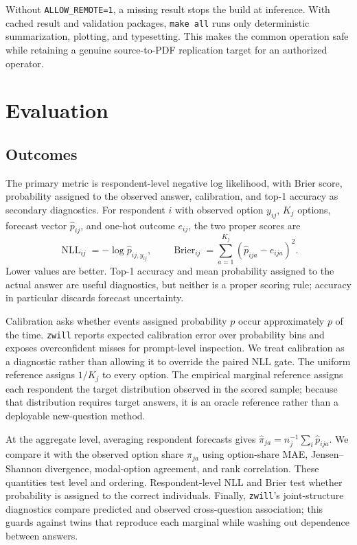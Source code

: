 \documentclass[11pt]{article}
\newcommand{\zwill}{\texttt{zwill}}
\begin{document}
Without \texttt{ALLOW\_REMOTE=1}, a missing result stops the build at
inference. With cached result and validation packages, \texttt{make all} runs
only deterministic summarization, plotting, and typesetting. This makes the
common operation safe while retaining a genuine source-to-PDF replication
target for an authorized operator.

\section{Evaluation}
\subsection{Outcomes}
The primary metric is respondent-level negative log likelihood, with Brier
score, probability assigned to the observed answer, calibration, and top-1
accuracy as secondary diagnostics. For respondent $i$ with observed option
$y_{ij}$, $K_j$ options, forecast vector $\widehat p_{ij}$, and one-hot outcome
$e_{ij}$, the two proper scores are
\[
 \operatorname{NLL}_{ij}=-\log\widehat p_{ij,y_{ij}},
 \qquad
 \operatorname{Brier}_{ij}=\sum_{a=1}^{K_j}
 (\widehat p_{ija}-e_{ija})^2.
\]
Lower values are better. Top-1 accuracy and mean probability assigned to the
actual answer are useful diagnostics, but neither is a proper scoring rule;
accuracy in particular discards forecast uncertainty.

Calibration asks whether events assigned probability $p$ occur approximately
$p$ of the time. \zwill{} reports expected calibration error over probability
bins and exposes overconfident misses for prompt-level inspection. We treat
calibration as a diagnostic rather than allowing it to override the paired NLL
gate. The uniform reference assigns $1/K_j$ to every option. The empirical
marginal reference assigns each respondent the target distribution observed in
the scored sample; because that distribution requires target answers, it is an
oracle reference rather than a deployable new-question method.

At the aggregate level, averaging respondent forecasts gives
$\widehat\pi_{ja}=n_j^{-1}\sum_i\widehat p_{ija}$. We compare it with the
observed option share $\pi_{ja}$ using option-share MAE, Jensen--Shannon
divergence, modal-option agreement, and rank correlation. These quantities test
level and ordering. Respondent-level NLL and Brier test whether probability is
assigned to the correct individuals. Finally, \zwill's joint-structure
diagnostics compare predicted and observed cross-question association; this
guards against twins that reproduce each marginal while washing out dependence
between answers.
\end{document}
